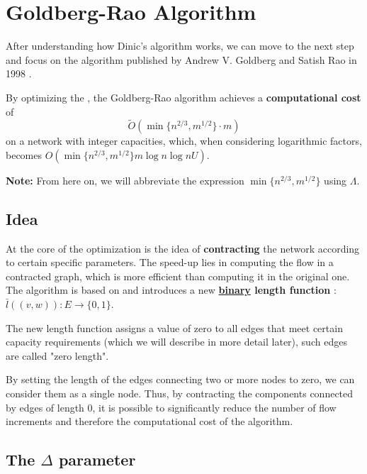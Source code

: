 
\chapter{Goldberg-Rao Algorithm}

\label{chap:gbr}
After understanding how Dinic's algorithm works, we can move to the next step and focus on the algorithm published by Andrew V. Goldberg and Satish Rao in 1998 \cite{Goldberg_Rao}.

\noindent By optimizing the , the Goldberg-Rao algorithm achieves a \textbf{computational cost} of 
\[
\tilde{O}(\min\{n^{2/3}, m^{1/2}\} \cdot m)
\]
on a network with integer capacities, which, when considering logarithmic factors, becomes \( O(\min\{n^{2/3}, m^{1/2}\} m \log n \log nU) \).

\textbf{Note:} From here on, we will abbreviate the expression \( \min\{n^{2/3}, m^{1/2}\} \) using \( \Lambda \).

\section{Idea}

    At the core of the optimization is the idea of \textbf{contracting} the network according to certain specific parameters.  
    The speed-up lies in computing the flow in a contracted graph, which is more efficient than computing it in the original one.
    The algorithm is based on  and introduces a new  \textbf{\underline{binary} length function} : \( \bar{l}((v,w)): E \rightarrow \{0,1\} \).  

    The new length function assigns a value of zero to all edges that meet certain capacity requirements (which we will describe in more detail later), such edges are called "zero length".

    By setting the length of the edges connecting two or more nodes to zero, we can consider them as a single node.  
    Thus, by contracting the components connected by edges of length 0, it is possible to significantly reduce the number of flow increments and therefore the computational cost of the algorithm.

\section{The $\Delta$ parameter}

